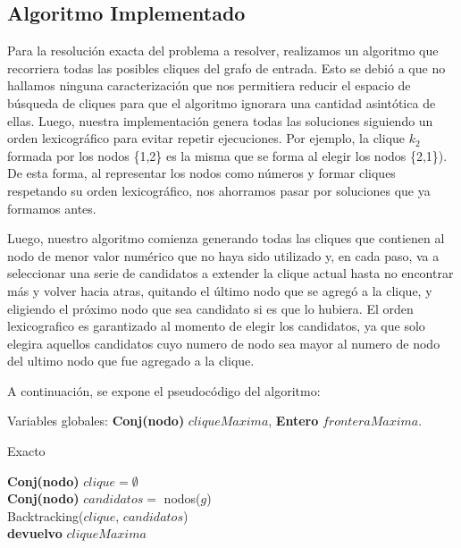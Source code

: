\subsection{Algoritmo Implementado}

Para la resolución exacta del problema a resolver, realizamos un algoritmo que recorriera todas las posibles cliques del grafo de entrada. Esto se debió a que no hallamos ninguna caracterización que nos permitiera reducir el espacio de búsqueda de cliques para que el algoritmo ignorara una cantidad asintótica de ellas. Luego, nuestra implementación genera todas las soluciones siguiendo un orden lexicográfico para evitar repetir ejecuciones. Por ejemplo, la clique $k_{2}$ formada por los nodos \{1,2\} es la misma que se forma al elegir los nodos \{2,1\}). De esta forma, al representar los nodos como números y formar cliques respetando su orden lexicográfico, nos ahorramos pasar por soluciones que ya formamos antes. %

Luego, nuestro algoritmo comienza generando todas las cliques que contienen al nodo de menor valor numérico que no haya sido utilizado y, en cada paso, va a seleccionar una serie de candidatos a extender la clique actual hasta no encontrar más y volver hacia atras, quitando el último nodo que se agregó a la clique, y eligiendo el próximo nodo que sea candidato si es que lo hubiera. El orden lexicografico es garantizado al momento de elegir los candidatos, ya que solo elegira aquellos candidatos cuyo numero de nodo sea mayor al numero de nodo del ultimo nodo que fue agregado a la clique.

A continuación, se expone el pseudocódigo del algoritmo:

Variables globales: \textbf{Conj(nodo)} $cliqueMaxima$, \textbf{Entero} $fronteraMaxima$.\\

\begin{algorithm}[H]
	\SetAlgoLined
	\caption{Exacto}

	\textbf{Conj(nodo)} $clique = \emptyset$\\
	\textbf{Conj(nodo)} $candidatos = $ nodos($g$)\\

	Backtracking($clique$, $candidatos$)\\

	\textbf{devuelvo} $cliqueMaxima$\\

\end{algorithm}

